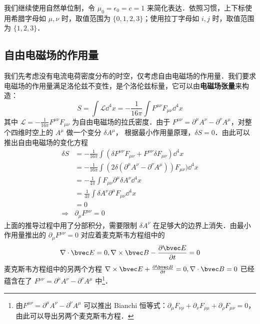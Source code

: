 

我们继续使用自然单位制，令 $\mu_0=\epsilon_0=c=1$ 来简化表达．依照习惯，上下标使用希腊字母如 $\mu, \nu$ 时，取值范围为 $\{0, 1, 2, 3\}$；使用拉丁字母如 $i, j$ 时，取值范围为 $\{1, 2, 3\}$．

\subsection{自由电磁场的作用量}
我们先考虑没有电流电荷密度分布的时空，仅考虑自由电磁场的作用量．我们要求电磁场的作用量满足洛伦兹不变性，是个洛伦兹标量，它可以由\textbf{电磁场张量}来构造：
\begin{equation}\label{ElecS_eq1}
S=\int {\mathcal L} {\dd}^4 x=-\frac{1}{16\pi}\int F^{\mu\nu}F_{\mu\nu}{\dd}^4 x 
\end{equation}
其中 $\mathcal L=-\frac{1}{16\pi}F^{\mu\nu}F_{\mu\nu}$ 为自由电磁场的拉氏密度．由于 $F^{\mu\nu}=\partial^\mu A^\nu -\partial^\nu A^\mu$，对整个四维时空上的 $A^\mu$ 做一个变分 $\delta A^\mu$，
根据最小作用量原理，$\delta S=0$．由此可以推出自由电磁场的变化方程
\begin{equation}
\begin{aligned}
\delta S&=-\frac{1}{16\pi}\int (\delta F^{\mu\nu}F_{\mu\nu}+F^{\mu\nu}\delta F_{\mu\nu}){\dd}^4 x\\
&=-\frac{1}{16\pi}\int (2\delta (\partial^\mu A^\nu-\partial^\nu A^\mu)) F_{\mu\nu}){\dd}^4 x\\
&=-\frac{1}{4\pi}\int F_{\mu\nu}\partial^\mu \delta A^\nu {\dd}^4 x\\
&=\frac{1}{4\pi}\int \delta A^\nu\partial^\mu F_{\mu\nu} {\dd}^4 x \\
&=0\\
\Rightarrow &\partial_\mu F^{\mu\nu}=0
\end{aligned}
\end{equation}
上面的推导过程中用了分部积分，需要限制 $\delta A^\nu$ 在足够大的边界上消失．由最小作用量推出的 $\partial_\mu F^{\mu\nu}=0$ 对应着麦克斯韦方程组中的
\begin{equation}
\nabla\cdot \bvec E=0,\nabla\times \bvec B-\frac{\partial \bvec E}{\partial t}=0
\end{equation}
麦克斯韦方程组中的另两个方程 $\nabla\times \bvec E+\frac{\partial \bvec B}{\partial t}=0,\nabla\cdot \bvec B=0$ 已经蕴含在了 $F^{\mu\nu}=\partial^\mu A^\nu-\partial^\nu A^\mu$ 中\footnote{由$F^{\mu\nu}=\partial^\mu A^\nu-\partial^\nu A^\mu$ 可以推出 Bianchi 恒等式：$\partial_{\mu}F_{\nu\rho}+\partial_{\nu}F_{\rho\mu}+\partial_{\rho}F_{\mu\nu}=0$，由此可以导出另两个麦克斯韦方程．}．

